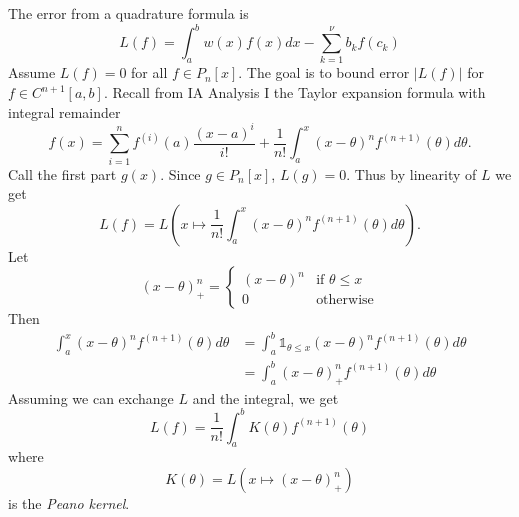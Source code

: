 \documentclass[a4paper]{article}
\begin{document}
The error from a quadrature formula is
\[
  L(f) = \int_a^b w(x)f(x) dx - \sum_{k = 1}^\nu b_kf(c_k)
\]
Assume \(L(f) = 0\) for all \(f \in P_n[x]\). The goal is to bound error \(|L(f)|\) for \(f \in C^{n + 1}[a, b]\). Recall from IA Analysis I the Taylor expansion formula with integral remainder
\[
  f(x) = \sum_{i = 1}^n f^{(i)}(a) \frac{(x - a)^i}{i!} + \frac{1}{n!} \int_a^x (x - \theta)^n f^{(n + 1)}(\theta) d\theta.
\]
Call the first part \(g(x)\). Since \(g \in P_n[x]\), \(L(g) = 0\). Thus by linearity of \(L\) we get
\[
  L(f) = L\left( x \mapsto \frac{1}{n!} \int_a^x (x - \theta)^n f^{(n + 1)}(\theta) d\theta \right).
\]
Let
\[
  (x - \theta)_+^n =
  \begin{cases}
    (x - \theta)^n & \text{if } \theta \leq x \\
    0 & \text{otherwise}
  \end{cases}
\]
Then
\begin{align*}
  \int_a^x (x - \theta)^n f^{(n + 1)}(\theta) d\theta & = \int_a^b 𝟙_{\theta \leq x} (x - \theta)^n f^{(n + 1)}(\theta) d\theta \\
                                                      &= \int_a^b (x - \theta)_+^n f^{(n + 1)}(\theta) d\theta
\end{align*}
Assuming we can exchange \(L\) and the integral, we get
\[
  L(f) = \frac{1}{n!} \int_a^b K(\theta)f^{(n + 1)}(\theta)
\]
where
\[
  K(\theta) = L(x \mapsto (x - \theta)_+^n)
\]
is the \emph{Peano kernel}.
\end{document}
